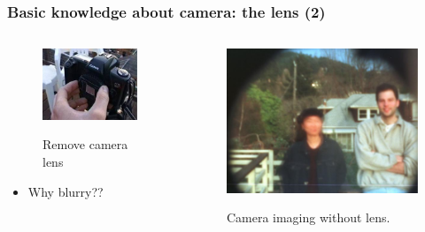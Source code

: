 \begin{frame}
 \frametitle{Basic knowledge about camera: the lens (2)}
  \vspace{-0.1in}
\begin{columns}
\begin{column}{0.35\linewidth}
\begin{figure}
\begin{center}
	{\includegraphics[width=0.75\linewidth]{./figs/removelens.pdf}}
\end{center}
\caption{Remove camera lens}
\end{figure}
\begin{itemize}
	\item {Why blurry??}
\end{itemize}
\end{column}
\begin{column}{0.65\linewidth}
\begin{figure}
\begin{center}
	{\includegraphics[width=0.95\linewidth]{./figs/photonolens.pdf}}
\end{center}
\caption{Camera imaging without lens.}
\end{figure}
\end{column}
\end{columns}
\end{frame}


